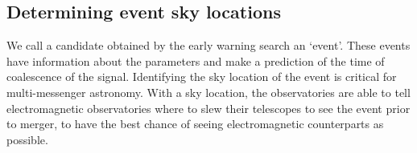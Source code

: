 \subsection{\label{6:sec:event-localisation}Determining event sky locations}


We call a \gwadj candidate obtained by the early warning search an `event'. These events have information about the \gwadj parameters and make a prediction of the time of coalescence of the \gwadj signal. Identifying the sky location of the event is critical for multi-messenger astronomy. With a sky location, the \gwadj observatories are able to tell electromagnetic observatories where to slew their telescopes to see the event prior to merger, to have the best chance of seeing electromagnetic counterparts as possible.

